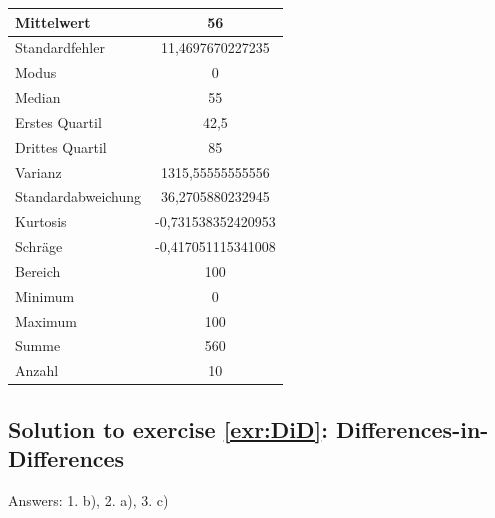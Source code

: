 \documentclass[
  12pt,
  oneside]{book}
\theoremstyle{definition}
\theoremstyle{definition}
\theoremstyle{definition}
\theoremstyle{definition}
\theoremstyle{remark}
\begin{document}
\begin{longtable}[]{@{}lc@{}}
\toprule()
Mittelwert & 56 \\
\midrule()
\endhead
Standardfehler & 11,4697670227235 \\
Modus & 0 \\
Median & 55 \\
Erstes Quartil & 42,5 \\
Drittes Quartil & 85 \\
Varianz & 1315,55555555556 \\
Standardabweichung & 36,2705880232945 \\
Kurtosis & -0,731538352420953 \\
Schräge & -0,417051115341008 \\
Bereich & 100 \\
Minimum & 0 \\
Maximum & 100 \\
Summe & 560 \\
Anzahl & 10 \\
\bottomrule()
\end{longtable}

\hypertarget{sol:DiD}{%
\subsection*{Solution to exercise \ref{exr:DiD}: Differences-in-Differences}\label{sol:DiD}}

Answers: 1. b), 2. a), 3. c)

  
\end{document}
